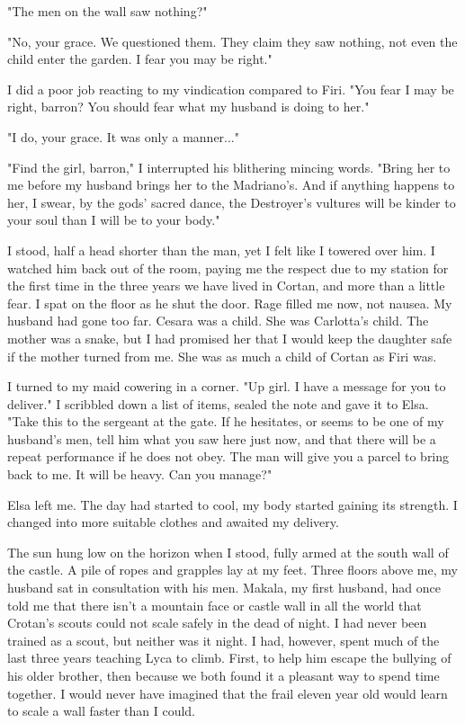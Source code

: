 \documentclass{article}
\begin{document}
"The men on the wall saw nothing?"

"No, your grace. We questioned them. They claim they saw nothing, not even the child enter the garden. I fear you may be right."

I did a poor job reacting to my vindication compared to Firi. "You fear I may be right, barron? You should fear what my husband is doing to her."

"I do, your grace. It was only a manner..." 

"Find the girl, barron," I interrupted his blithering mincing words. "Bring her to me before my husband brings her to the Madriano's. And if anything happens to her, I swear, by the gods' sacred dance, the Destroyer's vultures will be kinder to your soul than I will be to your body."

I stood, half a head shorter than the man, yet I felt like I towered over him. I watched him back out of the room, paying me the respect due to my station for the first time in the three years we have lived in Cortan, and more than a little fear. I spat on the floor as he shut the door. Rage filled me now, not nausea. My husband had gone too far. Cesara was a child. She was Carlotta's child. The mother was a snake, but I had promised her that I would keep the daughter safe if the mother turned from me. She was as much a child of Cortan as Firi was. 

I turned to my maid cowering in a corner. "Up girl. I have a message for you to deliver." I scribbled down a list of items, sealed the note and gave it to Elsa. "Take this to the sergeant at the gate. If he hesitates, or seems to be one of my husband's men, tell him what you saw here just now, and that there will be a repeat performance if he does not obey. The man will give you a parcel to bring back to me. It will be heavy. Can you manage?"

Elsa left me. The day had started to cool, my body started gaining its strength. I changed into more suitable clothes and awaited my delivery.

\vspace{.5cm}
 
The sun hung low on the horizon when I stood, fully armed at the south wall of the castle. A pile of ropes and grapples lay at my feet. Three floors above me, my husband sat in consultation with his men. Makala, my first husband, had once told me that there isn't a mountain face or castle wall in all the world that Crotan's scouts could not scale safely in the dead of night. I had never been trained as a scout, but neither was it night. I had, however, spent much of the last three years teaching Lyca to climb. First, to help him escape the bullying of his older brother, then because we both found it a pleasant way to spend time together. I would never have imagined that the frail eleven year old would learn to scale a wall faster than I could. 
\end{document}
